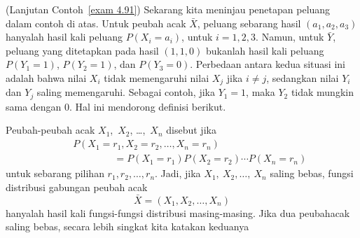 \begin{example}(Lanjutan Contoh~\ref{exam 4.91}){\label{exam 4.93}}
Sekarang kita meninjau penetapan peluang dalam contoh di atas.  Untuk peubah acak
${\bar X}$, peluang sebarang hasil $(a_1, a_2, a_3)$ hanyalah hasil kali
peluang $P(X_i = a_i)$, untuk $i = 1, 2, 3$.  Namun, untuk
${\bar Y}$, peluang yang ditetapkan pada hasil $(1, 1, 0)$ bukanlah hasil kali
peluang $P(Y_1 = 1)$, $P(Y_2 = 1)$, dan $P(Y_3 = 0)$.  Perbedaan antara kedua
situasi ini adalah bahwa nilai $X_i$ tidak memengaruhi nilai $X_j$ jika $i \ne j$,
sedangkan nilai $Y_i$ dan $Y_j$ saling memengaruhi.  Sebagai contoh, jika $Y_1 = 1$, maka
$Y_2$ tidak mungkin sama dengan 0.  Hal ini mendorong definisi berikut.
\end{example}

\begin{definition}\label{def 4.4.5}
Peubah-peubah acak $X_1$,~$X_2$, \ldots,~$X_n$ disebut  jika
\begin{eqnarray*}
&&P(X_1 = r_1, X_2 = r_2, \ldots, X_n = r_n)   \\
&& \;\;\;\;\;\;\;\;\;\;\;\;\;\;\; = P(X_1 = r_1) P(X_2 = r_2) \cdots  P(X_n = r_n)
\end{eqnarray*} 
untuk sebarang pilihan $r_1, r_2, \ldots, r_n$.  Jadi, jika $X_1,~X_2, \ldots,~X_n$ saling
bebas, fungsi distribusi gabungan peubah acak 
$${\bar X} = (X_1, X_2, \ldots, X_n)$$
hanyalah hasil kali fungsi-fungsi distribusi
masing-masing.  Jika dua peubah\linebreak[4] acak saling bebas, secara lebih
singkat kita katakan keduanya 
\end{definition}

